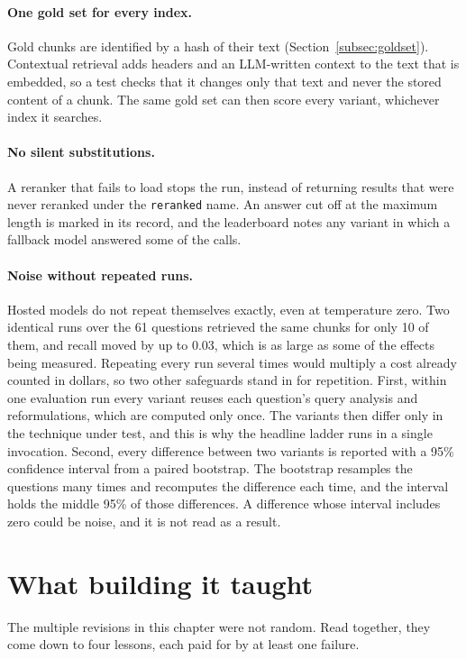 \paragraph{One gold set for every index.} Gold chunks are identified by a hash
of their text (Section~\ref{subsec:goldset}). Contextual retrieval adds
headers and an LLM-written context to the text that is embedded, so a test
checks that it changes only that text and never the stored content of a chunk.
The same gold set can then score every variant, whichever index it searches.

\paragraph{No silent substitutions.} A reranker that fails to load stops the
run, instead of returning results that were never reranked under the
\texttt{reranked} name. An answer cut off at the maximum length is marked in
its record, and the leaderboard notes any variant in which a fallback model
answered some of the calls.

\paragraph{Noise without repeated runs.} Hosted models do not repeat
themselves exactly, even at temperature zero. Two identical runs over the 61
questions retrieved the same chunks for only 10 of them, and recall moved by up
to 0.03, which is as large as some of the effects being measured. Repeating
every run several times would multiply a cost already counted in dollars, so
two other safeguards stand in for repetition. First, within one evaluation run
every variant reuses each question's query analysis and reformulations, which
are computed only once. The variants then differ only in the technique under
test, and this is why the headline ladder runs in a single invocation. Second,
every difference between two variants is reported with a 95\% confidence
interval from a paired bootstrap. The bootstrap resamples the questions many
times and recomputes the difference each time, and the interval holds the
middle 95\% of those differences. A difference whose interval includes zero
could be noise, and it is not read as a result.

\section{What building it taught} \label{sec:lessons}
The multiple revisions in this chapter were not random. Read together, they come down
to four lessons, each paid for by at least one failure.

